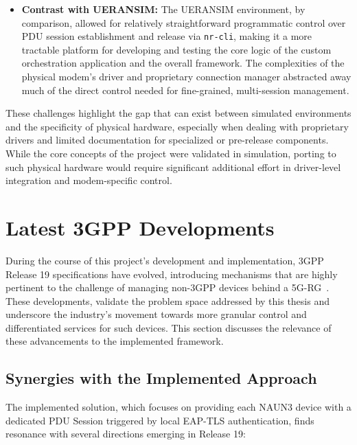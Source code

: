 \begin{itemize}
    \item \textbf{Contrast with UERANSIM:} The UERANSIM environment, by comparison, allowed for relatively straightforward programmatic control over \ac{PDU} session establishment and release via \texttt{nr-cli}, making it a more tractable platform for developing and testing the core logic of the custom orchestration application and the overall framework. The complexities of the physical modem's driver and proprietary connection manager abstracted away much of the direct control needed for fine-grained, multi-session management.
\end{itemize}

These challenges highlight the gap that can exist between simulated environments and the specificity of physical hardware, especially when dealing with proprietary drivers and limited documentation for specialized or pre-release components. While the core concepts of the project were validated in simulation, porting to such physical hardware would require significant additional effort in driver-level integration and modem-specific control.

\section{Latest \ac{3GPP} Developments}

During the course of this project's development and implementation, \ac{3GPP} Release 19 specifications have evolved, introducing mechanisms that are highly pertinent to the challenge of managing non-\ac{3GPP} devices behind a \ac{5G-RG}~\cite{23.316-p29}. These developments, validate the problem space addressed by this thesis and underscore the industry's movement towards more granular control and differentiated services for such devices. This section discusses the relevance of these advancements to the implemented framework.

\subsection{Synergies with the Implemented Approach}

The implemented solution, which focuses on providing each \ac{NAUN3} device with a dedicated \ac{PDU} Session triggered by local \ac{EAP-TLS} authentication, finds resonance with several directions emerging in Release 19:

